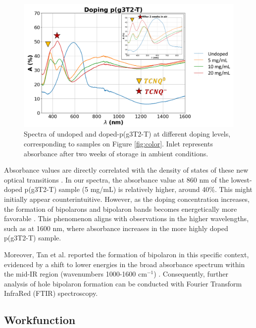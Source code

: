 \begin{figure}[ht]
  \centering
  \includegraphics[width=\textwidth]{Images/pdf/abs+inlet.pdf}
  \caption[Absorbance spectra of different doping levels of p(g3T2-T)]{Spectra of undoped and doped-p(g3T2-T) at different doping levels, corresponding to samples on Figure \ref{fig:color}. Inlet represents absorbance after two weeks of storage in ambient conditions.}
  \label{fig:abs}
\end{figure}

Absorbance values are directly correlated with the density of states of these new optical transitions \cite{bredasPolaronsBipolaronsSolitons1985}. In our spectra, the absorbance value at 860 nm of the lowest-doped p(g3T2-T) sample (5 mg/mL) is relatively higher, around 40\%. This might initially appear counterintuitive. However, as the doping concentration increases, the formation of bipolarons and bipolaron bands becomes energetically more favorable \cite{enenglDopinginducedAbsorptionBands2016} . This phenomenon aligns with observations in the higher wavelengths, such as at 1600 nm, where absorbance increases in the more highly doped p(g3T2-T) sample.

Moreover, Tan et al. reported the formation of bipolaron in this specific context, evidenced by a shift to lower energies in the broad absorbance spectrum within the mid-IR region (wavenumbers 1000-1600 cm$^{-1}$) \cite{tanTuningOrganicElectrochemical2022}. Consequently, further analysis of hole bipolaron formation can be conducted with Fourier Transform InfraRed (FTIR) spectroscopy.
 
\subsection{Workfunction}

